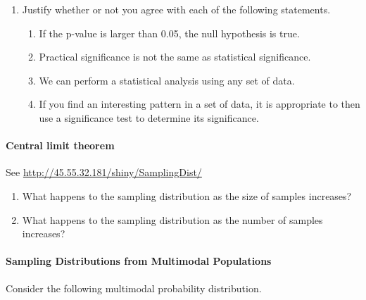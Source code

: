 \documentclass[10pt]{article}\usepackage[]{graphicx}\usepackage[]{color}
\begin{document}
\begin{enumerate}
    \item Justify whether or not you agree with each of the following statements.
    \begin{enumerate}
      \item If the p-value is larger than 0.05, the null hypothesis is true.
      \item Practical significance is not the same as statistical significance.
      \item We can perform a statistical analysis using any set of data.
      \item If you find an interesting pattern in a set of data, it is appropriate to then use a significance test to determine its significance.
    \end{enumerate}
  
  \end{enumerate}
  
\paragraph{Central limit theorem}

See \url{http://45.55.32.181/shiny/SamplingDist/}

\begin{enumerate}
\itemsep1in
\item What happens to the sampling distribution as the size of samples increases?
\item What happens to the sampling distribution as the number of samples increases?
\end{enumerate}
\vspace{1in}
\paragraph{Sampling Distributions from Multimodal Populations}

Consider the following multimodal probability distribution.
\end{document}
